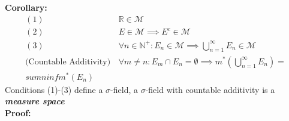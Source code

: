 \documentclass{article}
\newcommand{\R}{\mathbb{R}}
\newcommand{\N}{\mathbb{N}}
\newcommand{\sumninf}{\sum\limits_{n=1}^\infty}
\newcommand{\infcup}{\bigcup\limits_{n=1}^\infty}
\newcommand{\0}{{\bf{0}}}
\newcommand{\1}{{\bf{1}}}
\begin{document}
\textbf{Corollary:}
\begin{equation}
\begin{split}
    (1)\,&\R\in\mathcal{M}\\
    (2)\,&E\in\mathcal{M}\implies E^c\in\mathcal{M}\\
    (3)\,&\forall n\in\N^+:E_n\in\mathcal{M}\implies\infcup E_n\in\mathcal{M}\\
    \mbox{(Countable Additivity)}\,&\forall m\neq n:E_m\cap E_n=\emptyset\implies m^*\left(\infcup E_n\right)=\\sumninf m^*(E_n)
\end{split}
\end{equation}
Conditions (1)-(3) define a $\sigma$-field, a $\sigma$-field with countable additivity is a \textit{\textbf{measure space}}\\
\textbf{Proof:}
\end{document}
